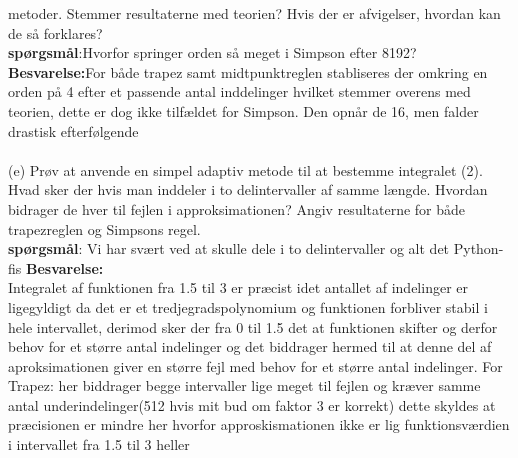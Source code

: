 metoder. Stemmer resultaterne med teorien? Hvis der er afvigelser, hvordan kan
de så forklares?\\
\textbf{spørgsmål}:Hvorfor springer orden så meget i Simpson efter 8192? \\
\textbf{Besvarelse:}For både trapez samt midtpunktreglen stabliseres der omkring en orden på 4 efter et passende antal inddelinger hvilket stemmer overens med teorien, dette er dog ikke tilfældet for Simpson. Den opnår de 16, men falder drastisk efterfølgende \\\\
(e) Prøv at anvende en simpel adaptiv metode til at bestemme integralet (2). Hvad
sker der hvis man inddeler i to delintervaller af samme længde. Hvordan bidrager de hver til fejlen i approksimationen? 
Angiv resultaterne for både trapezreglen og Simpsons regel. \\
\textbf{spørgsmål}: Vi har svært ved at skulle dele i to delintervaller og alt det Python-fis
\textbf{Besvarelse:} \\
Integralet af funktionen fra 1.5 til 3 er præcist idet antallet af indelinger er ligegyldigt da det er et tredjegradspolynomium og funktionen forbliver stabil i hele intervallet, derimod sker der fra 0 til 1.5 det at funktionen skifter og derfor behov for et større antal indelinger og det biddrager hermed til at denne del af aproksimationen giver en større fejl med behov for et større antal indelinger.
For Trapez: her biddrager begge intervaller lige meget til fejlen og kræver samme antal underindelinger(512 hvis mit bud om faktor 3 er korrekt) dette skyldes at præcisionen er mindre her hvorfor approskismationen ikke er lig funktionsværdien i intervallet fra 1.5 til 3 heller
%
